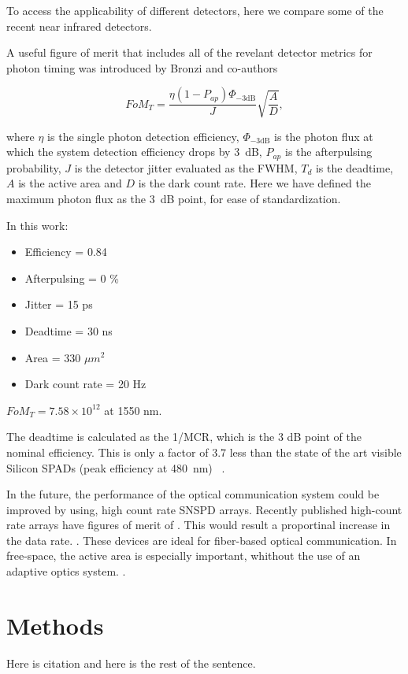 \documentclass{optica-article}
\begin{document}
To access the applicability of different detectors, here we compare some of the recent near infrared detectors. 

A useful figure of merit that includes all of the revelant detector metrics for photon timing was introduced by Bronzi and co-authors\cite{Bronzi2016}

$$FoM_T = \frac{\eta  (1 - P_{ap})\Phi_{-3 \text{dB}}}{J} \sqrt{\frac{A}{D}},$$

where $\eta$ is the single photon detection efficiency, $\Phi_{-3 \text{dB}}$ is the photon flux at which the system detection efficiency drops by 3~dB, $P_{ap}$ is the afterpulsing probability, $J$ is the detector jitter evaluated as the FWHM, $T_d$ is the deadtime, $A$ is the active area and $D$ is the dark count rate. Here we have defined the maximum photon flux as the 3~dB point, for ease of standardization.

In this work:
\begin{itemize}
    \item Efficiency = 0.84
    \item Afterpulsing = 0 \%
    \item Jitter = 15 ps
    \item Deadtime = 30 ns 
    \item Area = 330 $\mu m^2$
    \item Dark count rate = 20 Hz
\end{itemize}
$FoM_T = 7.58 \times 10^{12}$ at 1550 nm.

The deadtime is calculated as the 1/MCR, which is the 3 dB point of the nominal efficiency. This is only a factor of 3.7 less than the state of the art visible Silicon SPADs (peak efficiency at 480~nm) ~\cite{Gramuglia2022}.

In the future, the performance of the optical communication system could be improved by using, high count rate SNSPD arrays. Recently published high-count rate arrays have figures of merit of . This would result a proportinal increase in the data rate.
.
These devices are ideal for fiber-based optical communication. In free-space, the active area is especially important, whithout the use of an adaptive optics system.
.

\hypertarget{methods}{%
\section{Methods}\label{methods}}



Here is citation \cite{Dolinar2011Photon} and here is the rest of the sentence.


\end{document}
